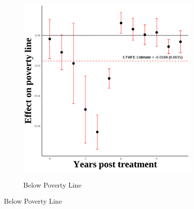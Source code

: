 \documentclass[12pt,english]{article}
\begin{document}
\begin{figure}[H]
\begin{subfigure}[b]{0.3\textwidth}
    \label{fig:snap-fourth}
  \end{subfigure}
  \hfill
  \begin{subfigure}[b]{0.3\textwidth}
    \centering
    \caption{Below Poverty Line}
    \includegraphics[width=\linewidth]{figures/plot94-poverty_line_event_study-fourth.png}
    \label{fig:poverty-line-fourth}
  \end{subfigure}

  \vspace{0.3cm} %


\end{figure}
\end{document}
